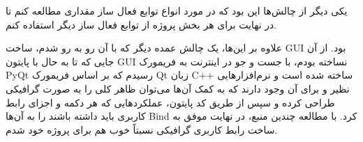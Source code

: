 \documentclass[12pt,titlepage,a4page , tikz , multi,table , svgnames,xcdraw]{article}
\begin{document}
یکی دیگر از چالش‌ها این بود که در مورد انواع توابع فعال ساز مقداری مطالعه کنم تا در نهایت برای هر بخش پروژه از توابع فعال ساز دیگر استفاده کنم.

علاوه بر این‌ها، یک چالش عمده دیگر که با آن رو به رو شدم، ساخت GUI بود. از آن جایی که تا به حال با پایتون GUI نساخته بودم، با جست و جو در اینترنت به فریمورک PyQt رسیدم که بر اساس فریمورک Qt زبان C++ ساخته شده است و نرم‌افزارهایی نظیر  و  برای آن وجود دارند که به کمک آن‌ها می‌توان ظاهر کلی را به صورت گرافیکی طراحی کرده و سپس از طریق کد پایتون، عملکردهایی که هر دکمه و اجزای رابط کاربری باید داشته باشند را به آن‌ها Bind کرد. با مطالعه چندین منبع، در نهایت موفق به ساخت رابط کاربری گرافیکی نسبتاً خوب هم برای پروژه خود شدم.
\end{document}
